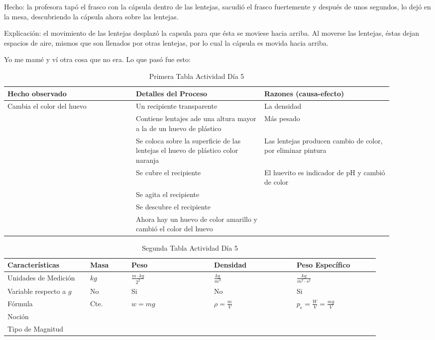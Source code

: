 \documentclass[12pt]{report}
\newcounter{it}
\theoremstyle{largebreak}
\begin{document}
    Hecho: la profesora tapó el frasco con la cápsula dentro de las lentejas, sacudió el frasco fuertemente y después de unos segundos, lo dejó en la mesa, descubriendo la cápsula ahora sobre las lentejas.

    Explicación: el movimiento de las lentejas desplazó la capsula para que ésta se moviese hacia arriba. Al moverse las lentejas, éstas dejan espacios de aire, mismos que son llenados por otras lentejas, por lo cual la cápsula es movida hacia arriba.

    Yo me mamé y ví otra cosa que no era. Lo que pasó fue esto:
    
    \begin{table}[ht]
        \centering
        \begin{tabular}{p{0.3\linewidth} | p{0.3\linewidth} | p{0.3\linewidth}}
            Hecho observado & Detalles del Proceso & Razones (causa-efecto) \\
            \hline
            Cambia el color del huevo & Un recipiente transparente & La densidad \\
             & Contiene lentajes ade una altura mayor a la de un huevo de plástico & Más pesado \\
             & Se coloca sobre la superficie de las lentejas el huevo de plástico color naranja &  Las lentejas producen cambio de color, por eliminar pintura\\
             & Se cubre el recipiente & El huevito es indicador de pH y cambió de color \\
             & Se agita el recipiente & \\
             & Se descubre el recipiente & \\
             & Ahora hay un huevo de color amarillo y cambió el color del huevo & \\
        \end{tabular}
        \caption{Primera Tabla Actividad Día 5}
        \label{tab:my_label}
    \end{table}

    \begin{table}[ht]
        \centering
        \begin{tabular}{p{0.2\linewidth} | p{0.1\linewidth} | p{0.2\linewidth} | p{0.2\linewidth} | p{0.2\linewidth}}
            Características & Masa & Peso & Densidad & Peso Específico \\
            \hline
            Unidades de Medición & $kg$ & $\frac{m\cdot kg}{2^2}$ & $\frac{kg}{m^3}$ & $\frac{kg }{m^2\cdot s^2}$ \\
            Variable respecto a $g$ & No & Si & No & Si \\
            Fórmula & Cte. & $w=mg$ & $\rho=\frac{m}{V}$ & $p_e=\frac{W}{V}=\frac{mg}{V}$ \\
            Noción &  &  &  &  \\
            Tipo de Magnitud &  &  &  &  \\ 
        \end{tabular}
        \caption{Segunda Tabla Actividad Día 5}
        \label{tab:my_label}
    \end{table}
\end{document}
